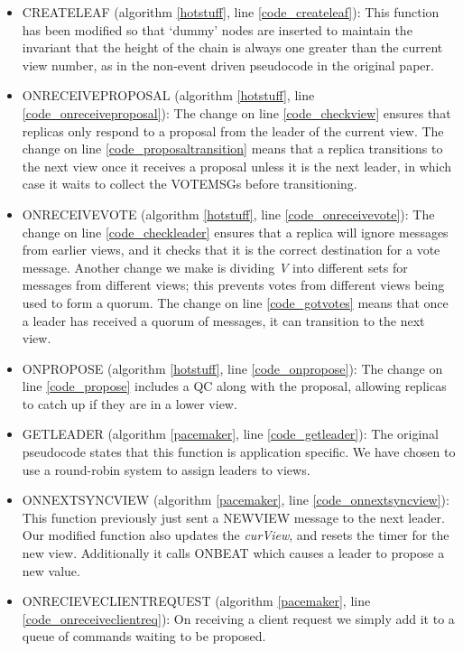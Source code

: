 \begin{itemize}
	\item CREATE{\large L}EAF (algorithm \ref{hotstuff}, line \ref{code_createleaf}): This function has been modified so that `dummy' nodes are inserted to maintain the invariant that the height of the chain is always one greater than the current view number, as in the non-event driven pseudocode in the original paper.
	\item ON{\large R}ECEIVE{\large P}ROPOSAL (algorithm \ref{hotstuff}, line \ref{code_onreceiveproposal}): The change on line \ref{code_checkview} ensures that replicas only respond to a proposal from the leader of the current view. The change on line \ref{code_proposaltransition} means that a replica transitions to the next view once it receives a proposal unless it is the next leader, in which case it waits to collect the VOTE{\large M}SGs before transitioning.
	\item ON{\large R}ECEIVE{\large V}OTE (algorithm \ref{hotstuff}, line \ref{code_onreceivevote}): The change on line \ref{code_checkleader} ensures that a replica will ignore messages from earlier views, and it checks that it is the correct destination for a vote message. Another change we make is dividing \textit{V} into different sets for messages from different views; this prevents votes from different views being used to form a quorum. The change on line \ref{code_gotvotes} means that once a leader has received a quorum of messages, it can transition to the next view.
	\item ON{\large P}ROPOSE (algorithm \ref{hotstuff}, line \ref{code_onpropose}): The change on line \ref{code_propose} includes a QC along with the proposal, allowing replicas to catch up if they are in a lower view.
	\item GET{\large L}EADER (algorithm \ref{pacemaker}, line \ref{code_getleader}): The original pseudocode states that this function is application specific. We have chosen to use a round-robin system to assign leaders to views.
	\item ON{\large N}EXT{\large S}YNC{\large V}IEW (algorithm \ref{pacemaker}, line \ref{code_onnextsyncview}): This function previously just sent a NEW{\large V}IEW message to the next leader. Our modified function also updates the \textit{curView}, and resets the timer for the new view. Additionally it calls ON{\large B}EAT which causes a leader to propose a new value.
	\item ON{\large R}ECIEVE{\large C}LIENT{\large R}EQUEST (algorithm \ref{pacemaker}, line \ref{code_onreceiveclientreq}): On receiving a client request we simply add it to a queue of commands waiting to be proposed.

\end{itemize}
